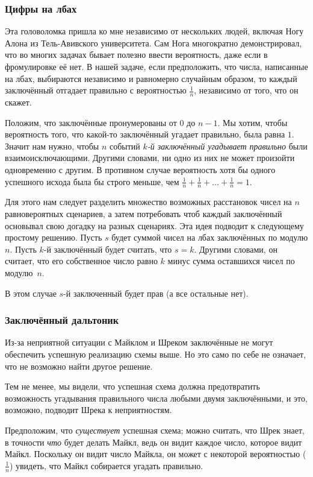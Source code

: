 \subsubsection*{Цифры на лбах}

Эта головоломка пришла ко мне независимо от нескольких людей, включая Ногу Алона из Тель-Авивского университета.
Сам Нога многократно демонстрировал, что во многих задачах бывает полезно ввести вероятность, даже если в фромулировке её нет.
В нашей задаче, если предположить, что числа, написанные на лбах, выбираются независимо и равномерно случайным образом, то каждый заключённый отгадает правильно с вероятностью $\tfrac1n$, независимо от того, что он скажет.

Положим, что заключённые пронумерованы от $0$ до $n-1$.
Мы хотим, чтобы вероятность того, что какой-то заключённый угадает правильно, была равна $1$.
Значит нам нужно, чтобы $n$ событий \emph{$k$-й заключённый угадывает правильно} были взаимоисключающими.
Другими словами, ни одно из них не может произойти одновременно с другим.
В противном случае вероятность хотя бы одного успешного исхода была бы строго меньше, чем $\tfrac1n + \tfrac1n + \dots + \tfrac1n = 1$.

Для этого нам следует разделить множество возможных расстановок чисел на $n$ равновероятных сценариев, а затем потребовать чтоб каждый заключённый основывал свою догадку на разных сценариях.
Эта идея подводит к следующему простому решению.
Пусть $s$ будет суммой чисел на лбах заключённых по модулю $n$.
Пусть $k$-й заключённый будет считать, что $s = k$.
Другими словами, он считает, что его собственное число равно $k$ минус сумма оставшихся чисел по модулю~$n$.

В этом случае $s$-й заключенный будет прав (а все остальные нет).

\subsubsection*{Заключённый дальтоник}

Из-за неприятной ситуации с Майклом и Шреком заключённые не могут обеспечить успешную реализацию схемы выше. Но это само по себе не означает, что не возможно найти другое решение.

Тем не менее, мы видели, что успешная схема должна предотвратить возможность угадывания правильного числа любыми двумя заключёнными, и это, возможно, подводит Шрека к неприятностям.

Предположим, что \emph{существует} успешная схема; можно считать, что Шрек знает, в точности \emph{что} будет делать Майкл,
ведь он видит каждое число, которое видит Майкл.
Поскольку он видит число Майкла, он может с некоторой вероятностью ($\tfrac1n$) увидеть, что Майкл собирается угадать правильно.

